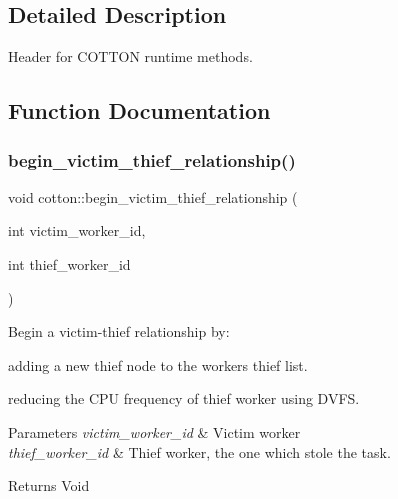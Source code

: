 \subsection{Detailed Description}
Header for C\+O\+T\+T\+ON runtime methods. 



\subsection{Function Documentation}
\mbox{\label{cotton-runtime_8h_file_af567cb17aa6a653d9a567fb65f40b716}} 
\subsubsection{\texorpdfstring{begin\+\_\+victim\+\_\+thief\+\_\+relationship()}{begin\_victim\_thief\_relationship()}}
{\footnotesize\ttfamily void cotton\+::begin\+\_\+victim\+\_\+thief\+\_\+relationship (\begin{DoxyParamCaption}\item[{int}]{victim\+\_\+worker\+\_\+id,  }\item[{int}]{thief\+\_\+worker\+\_\+id }\end{DoxyParamCaption})}

Begin a victim-\/thief relationship by\+:
\begin{DoxyItemize}
\item adding a new thief node to the worker\textquotesingle{}s thief list.
\item reducing the C\+PU frequency of thief worker using D\+V\+FS.
\end{DoxyItemize}


\begin{DoxyParams}{Parameters}
{\em victim\+\_\+worker\+\_\+id} & Victim worker \\
\hline
{\em thief\+\_\+worker\+\_\+id} & Thief worker, the one which stole the task.\\
\hline
\end{DoxyParams}
\begin{DoxyReturn}{Returns}
Void 
\end{DoxyReturn}
\mbox{\label{cotton-runtime_8h_file_a522a9376ec51306eab1724b2a9a1cf93}} 
